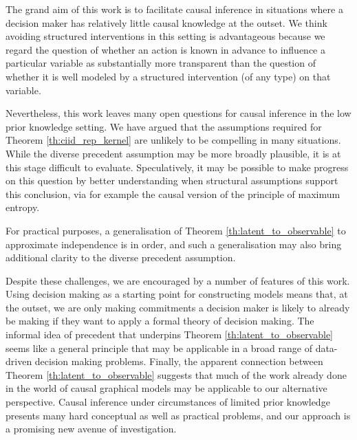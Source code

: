 The grand aim of this work is to facilitate causal inference in situations where a decision maker has relatively little causal knowledge at the outset. We think avoiding structured interventions in this setting is advantageous because we regard the question of whether an action is known in advance to influence a particular variable as substantially more transparent than the question of whether it is well modeled by a structured intervention (of any type) on that variable.

Nevertheless, this work leaves many open questions for causal inference in the low prior knowledge setting. We have argued that the assumptions required for Theorem \ref{th:ciid_rep_kernel} are unlikely to be compelling in many situations. While the diverse precedent assumption may be more broadly plausible, it is at this stage difficult to evaluate. Speculatively, it may be possible to make progress on this question by better understanding when structural assumptions support this conclusion, via for example the causal version of the principle of maximum entropy.

For practical purposes, a generalisation of Theorem \ref{th:latent_to_observable} to approximate independence is in order, and such a generalisation may also bring additional clarity to the diverse precedent assumption.

Despite these challenges, we are encouraged by a number of features of this work. Using decision making as a starting point for constructing models means that, at the outset, we are only making commitments a decision maker is likely to already be making if they want to apply a formal theory of decision making. The informal idea of precedent that underpins Theorem \ref{th:latent_to_observable} seems like a general principle that may be applicable in a broad range of data-driven decision making problems. Finally, the apparent connection between Theorem \ref{th:latent_to_observable} suggests that much of the work already done in the world of causal graphical models may be applicable to our alternative perspective. Causal inference under circumstances of limited prior knowledge presents many hard conceptual as well as practical problems, and our approach is a promising new avenue of investigation.